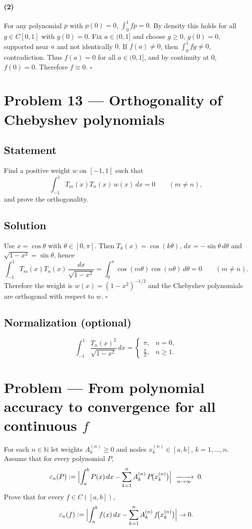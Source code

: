 \documentclass[12pt,a4paper]{article}
\newcommand{\qed}{\hfill$\square$}
\theoremstyle{plain}
\theoremstyle{definition}
\theoremstyle{remark}
\theoremstyle{remark}
\begin{document}
	\paragraph{(2)} For any polynomial $p$ with $p(0)=0$, $\int_0^1 f p=0$. By density this holds for all
	$g\in C[0,1]$ with $g(0)=0$. Fix $a\in(0,1]$ and choose $g\ge0$, $g(0)=0$, supported near $a$ and not identically $0$.
	If $f(a)\ne0$, then $\int_0^1 f g\ne0$, contradiction. Thus $f(a)=0$ for all $a\in(0,1]$, and by continuity at $0$,
	$f(0)=0$. Therefore $f\equiv0$. \qed
	
	\section*{Problem 13 — Orthogonality of Chebyshev polynomials}
	
	\subsection*{Statement}
	Find a positive weight $w$ on $[-1,1]$ such that
	\[
	\int_{-1}^{1} T_m(x)T_n(x)\,w(x)\,dx=0\qquad (m\ne n),
	\]
	and prove the orthogonality.
	
	\subsection*{Solution}
	Use $x=\cos\theta$ with $\theta\in[0,\pi]$. Then $T_k(x)=\cos(k\theta)$, $dx=-\sin\theta\,d\theta$ and
	$\sqrt{1-x^2}=\sin\theta$, hence
	\[
	\int_{-1}^{1} T_m(x)T_n(x)\,\frac{dx}{\sqrt{1-x^2}}
	=\int_{0}^{\pi} \cos(m\theta)\cos(n\theta)\,d\theta=0\qquad(m\ne n).
	\]
	Therefore the weight is $w(x)=(1-x^2)^{-1/2}$ and the Chebyshev polynomials are orthogonal with respect to $w$.
	\qed
	
	\subsection*{Normalization (optional)}
	\[
	\int_{-1}^{1}\frac{T_n(x)^2}{\sqrt{1-x^2}}\,dx=
	\begin{cases}
		\pi,& n=0,\\[3pt]
		\frac{\pi}{2},& n\ge1.
	\end{cases}
	\]
	\section*{Problem — From polynomial accuracy to convergence for all continuous $f$}
	
	For each $n\in\mathbb N$ let weights $A_k^{(n)}\ge 0$ and nodes $x_k^{(n)}\in[a,b]$, $k=1,\dots,n$.
	Assume that for every polynomial $P$,
	\[
	\varepsilon_n(P):=\Bigl|\int_a^b P(x)\,dx-\sum_{k=1}^n A_k^{(n)}\,P\!\bigl(x_k^{(n)}\bigr)\Bigr|
	\;\xrightarrow[n\to\infty]{}\;0 .
	\]
	Prove that for every $f\in C([a,b])$,
	\[
	\varepsilon_n(f):=\Bigl|\int_a^b f(x)\,dx-\sum_{k=1}^n A_k^{(n)}\,f\!\bigl(x_k^{(n)}\bigr)\Bigr|\to 0.
	\]
	
\end{document}
